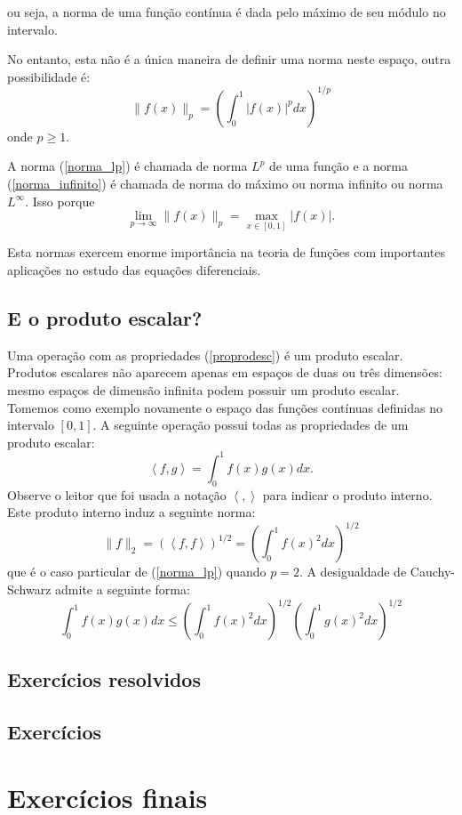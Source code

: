 ou seja, a norma de uma função contínua é dada pelo máximo de seu módulo no intervalo.

No entanto, esta não é a única maneira de definir uma norma neste espaço, outra possibilidade é:
\begin{equation}\label{norma_lp}\|f(x)\|_{p}=\left(\int_0^1|f(x)|^pdx\right)^{1/p}\end{equation}
onde $p\geq 1$.

A norma (\ref{norma_lp}) é chamada de norma $L^p$ de uma função e a norma (\ref{norma_infinito}) é chamada de norma do máximo ou norma infinito ou norma $L^{\infty}$. Isso porque
$$\lim_{p\to\infty}\|f(x)\|_{p}=\max_{x\in [0,1]}|f(x)|.$$

Esta normas exercem enorme importância na teoria de funções com importantes aplicações no estudo das equações diferenciais.

\subsection{E o produto escalar?}
Uma operação com as propriedades (\ref{proprodesc}) é um produto escalar. Produtos escalares não aparecem apenas em espaços de duas ou três dimensões: mesmo espaços de dimensão infinita podem possuir um produto escalar. Tomemos como exemplo novamente o espaço das funções contínuas definidas no intervalo $[0,1]$. A seguinte operação possui todas as propriedades de um produto escalar:
$$\left<f,g\right>=\int_0^1f(x)g(x)dx.$$
Observe o leitor que foi usada a notação $\left<,\right>$ para indicar o produto interno. Este produto interno induz a seguinte norma:
$$\|f\|_2=\left(\left<f,f\right>\right)^{1/2}=\left(\int_0^1f(x)^2dx\right)^{1/2}$$
que é o caso particular de (\ref{norma_lp}) quando $p=2$.
 A desigualdade de Cauchy-Schwarz admite a seguinte forma:
$$\int_0^1f(x)g(x)dx \leq \left(\int_0^1f(x)^2dx\right)^{1/2} \left(\int_0^1g(x)^2dx\right)^{1/2}$$


\subsection*{Exercícios resolvidos}

\construirExeresol

\subsection*{Exercícios}

\construirExer

\section{Exercícios finais}

\construirExer
